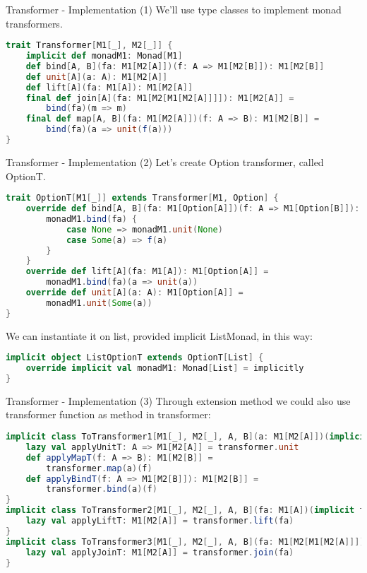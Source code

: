 \begin{frame}[fragile]{Transformer - Implementation (1)}
	We'll use type classes to implement monad transformers.
\begin{lstlisting}[language=scala]
trait Transformer[M1[_], M2[_]] {
	implicit def monadM1: Monad[M1]	
	def bind[A, B](fa: M1[M2[A]])(f: A => M1[M2[B]]): M1[M2[B]]
	def unit[A](a: A): M1[M2[A]]
	def lift[A](fa: M1[A]): M1[M2[A]]
	final def join[A](fa: M1[M2[M1[M2[A]]]]): M1[M2[A]] =
		bind(fa)(m => m)
	final def map[A, B](fa: M1[M2[A]])(f: A => B): M1[M2[B]] =
		bind(fa)(a => unit(f(a)))
}
\end{lstlisting}
\end{frame}

\begin{frame}[fragile]{Transformer - Implementation (2)}	
	Let's create Option transformer, called OptionT.
\begin{lstlisting}[language=scala]
trait OptionT[M1[_]] extends Transformer[M1, Option] {
	override def bind[A, B](fa: M1[Option[A]])(f: A => M1[Option[B]]): M1[Option[B]] = {
		monadM1.bind(fa) {
			case None => monadM1.unit(None)
			case Some(a) => f(a)
		}
	}
	override def lift[A](fa: M1[A]): M1[Option[A]] =
		monadM1.bind(fa)(a => unit(a))
	override def unit[A](a: A): M1[Option[A]] = 
		monadM1.unit(Some(a))
}		
\end{lstlisting}		
	We can instantiate it on list, provided implicit ListMonad, in  this way:
\begin{lstlisting}[language=scala]
implicit object ListOptionT extends OptionT[List] {
	override implicit val monadM1: Monad[List] = implicitly
}
\end{lstlisting}
\end{frame}

\begin{frame}[fragile]{Transformer - Implementation (3)}	
	Through extension method we could also use transformer function as method in transformer:
\begin{lstlisting}[language=scala]
implicit class ToTransformer1[M1[_], M2[_], A, B](a: M1[M2[A]])(implicit transformer: Transformer[M1, M2]) {
	lazy val applyUnitT: A => M1[M2[A]] = transformer.unit
	def applyMapT(f: A => B): M1[M2[B]] = 
		transformer.map(a)(f)	
	def applyBindT(f: A => M1[M2[B]]): M1[M2[B]] = 
		transformer.bind(a)(f)
}
implicit class ToTransformer2[M1[_], M2[_], A, B](fa: M1[A])(implicit transformer: Transformer[M1, M2]) {
	lazy val applyLiftT: M1[M2[A]] = transformer.lift(fa)
}
implicit class ToTransformer3[M1[_], M2[_], A, B](fa: M1[M2[M1[M2[A]]]])(implicit transformer: Transformer[M1, M2]) {
	lazy val applyJoinT: M1[M2[A]] = transformer.join(fa)
}
\end{lstlisting}	
\end{frame}

